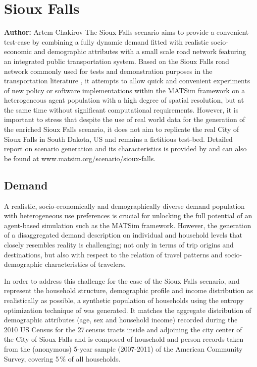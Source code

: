 \section{Sioux Falls}
\label{ch:scenarios:siouxfalls}
\hfill \textbf{Author:} Artem Chakirov
The Sioux Falls scenario aims to provide a convenient test-case by combining a fully dynamic demand fitted with realistic socio-economic and demographic attributes with a small scale road network featuring an integrated public transportation system. Based on the Sioux Falls road network commonly used for tests and demonstration purposes in the transportation literature \citep[][]{BarGera_TNTP_Webpage_2013}, it attempts to allow quick and convenient experiments of new policy or software implementations within the MATSim framework on a heterogeneous agent population with a high degree of spatial resolution, but at the same time without significant computational requirements. However, it is important to stress that despite the use of real world data for the generation of the enriched Sioux Falls scenario, it does not aim to replicate the real City of Sioux Falls in South Dakota, US and remains a fictitious test-bed. Detailed report on scenario generation and its characteristics is provided by \citet[][]{ChakirovFourie_TechRep_FCL_2014} and can also be found at www.matsim.org/scenario/sioux-falls. 

\subsection{Demand}
A realistic, socio-economically and demographically diverse demand population with  heterogeneous use preferences is crucial for unlocking the full potential of an agent-based simulation such as the MATSim framework. However, the generation of a disaggregated demand description on individual and household levels that closely resembles reality is challenging; not only in terms of trip origins and destinations, but also with respect to the relation of travel patterns and socio-demographic characteristics of travelers.

In order to address this challenge for the case of the Sioux Falls scenario, and represent the household structure, demographic profile and income distribution as realistically as possible, a synthetic population of households using the entropy optimization technique of \citet[][]{BarGeraEtAl_TRB_2009} was generated. It matches the aggregate distribution of demographic attributes (age, sex and household income) recorded during the 2010 US Census for the 27\,census tracts inside and adjoining the city center of the City of Sioux Falls and is composed of household and person records taken from the (anonymous) 5-year sample (2007-2011) of the American Community Survey, covering 5\,\% of all households.

